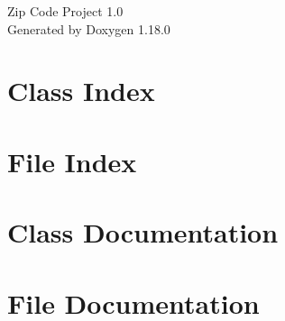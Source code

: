 \documentclass[twoside]{book}
\newcommand{\+}{\discretionary{\mbox{\scriptsize$\hookleftarrow$}}{}{}}
\newcommand{\clearemptydoublepage}{%
    \newpage{\pagestyle{empty}\cleardoublepage}%
  }
\begin{document}
  \raggedbottom
    \hypersetup{pageanchor=false,
                bookmarksnumbered=true,
                pdfencoding=unicode
               }
  \begin{titlepage}
  \vspace*{7cm}
  \begin{center}%
  {\Large Zip Code Project 1.\+0}\\
  \vspace*{1cm}
  {\large Generated by Doxygen 1.18.0}\\
  \end{center}
  \end{titlepage}
  \clearemptydoublepage
  \tableofcontents
  \clearemptydoublepage
  \hypersetup{pageanchor=true}
\chapter{Class Index}

\chapter{File Index}

\chapter{Class Documentation}


\chapter{File Documentation}


  \backmatter
  \newpage
  \clearemptydoublepage
  \printindex
\end{document}
